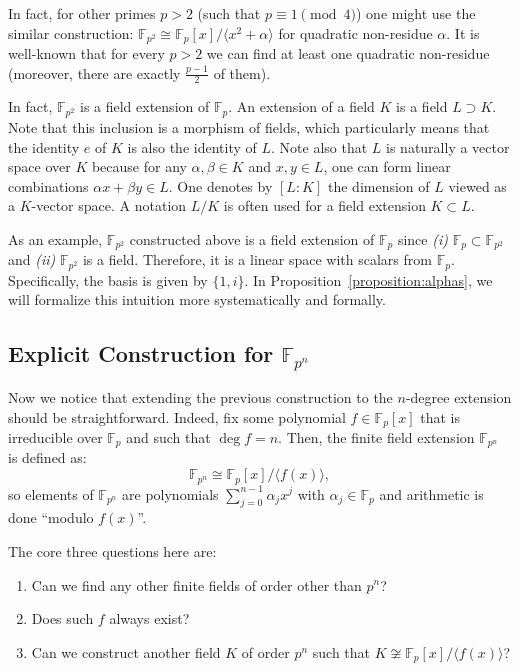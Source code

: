\documentclass{template}
\begin{document}
\begin{remark}
    In fact, for other primes $p>2$ (such that $p \equiv 1 \pmod{4}$) one might
    use the similar construction: $\mathbb{F}_{p^2} \cong
    \mathbb{F}_p[x]/\langle x^2+\alpha \rangle$ for quadratic non-residue
    $\alpha$. It is well-known that for every $p>2$ we can find at least one
    quadratic non-residue (moreover, there are exactly $\frac{p-1}{2}$ of them).
\end{remark}

In fact, $\mathbb{F}_{p^2}$ is a field extension of $\mathbb{F}_p$. An extension
of a field $K$ is a field $L \supset K$. Note that this inclusion is a morphism
of fields, which particularly means that the identity $e$ of $K$ is also the
identity of $L$. Note also that $L$ is naturally a vector space over $K$ because
for any $\alpha,\beta \in K$ and $x,y \in L$, one can form linear combinations
$\alpha x+\beta y \in L$. One denotes by $[L:K]$ the dimension of $L$ viewed as
a $K$-vector space. A notation $L/K$ is often used for a field extension $K
\subset L$.

As an example, $\mathbb{F}_{p^2}$ constructed above is a field extension of
$\mathbb{F}_p$ since \textit{(i)} $\mathbb{F}_p \subset \mathbb{F}_{p^2}$ and
\textit{(ii)} $\mathbb{F}_{p^2}$ is a field. Therefore, it is a linear space
with scalars from $\mathbb{F}_p$. Specifically, the basis is given by $\{1,i\}$.
In Proposition~\ref{proposition:alphas}, we will formalize this intuition more
systematically and formally.

\subsection{Explicit Construction for $\mathbb{F}_{p^n}$}

Now we notice that extending the previous construction to the $n$-degree
extension should be straightforward. Indeed, fix some polynomial $f \in
\mathbb{F}_p[x]$ that is irreducible over $\mathbb{F}_p$ and such that $\deg
f=n$. Then, the finite field extension $\mathbb{F}_{p^n}$ is defined as:
\begin{equation*}
    \mathbb{F}_{p^n} \cong \mathbb{F}_p[x] / \langle f(x) \rangle,
\end{equation*}
so elements of $\mathbb{F}_{p^n}$ are polynomials $\sum_{j=0}^{n-1}\alpha_jx^j$
with $\alpha_j \in \mathbb{F}_p$ and arithmetic is done ``modulo $f(x)$''.

The core three questions here are: 
\begin{enumerate}
    \item[\textbf{Q1}] Can we find any other finite fields of order other than $p^n$?
    \item[\textbf{Q2}] Does such $f$ always exist?
    \item[\textbf{Q3}] Can we construct another field $K$ of order $p^n$ such
    that $K \not\cong \mathbb{F}_p[x] / \langle f(x) \rangle$?
\end{enumerate}
\end{document}
